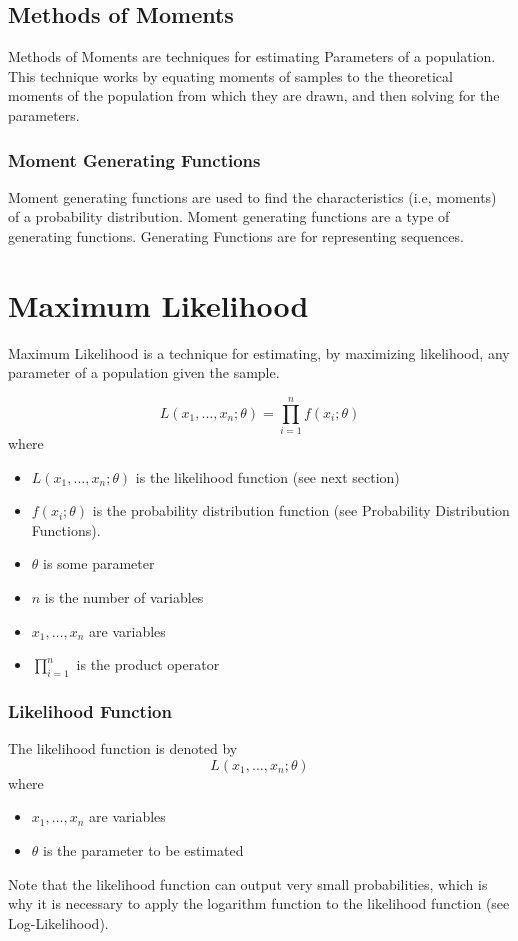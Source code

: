 \documentclass{article}
\begin{document}
\subsection{Methods of Moments}
Methods of Moments are techniques for estimating Parameters of a population. This technique works by equating moments of samples to the theoretical moments of the population from which they are drawn, and then solving for the parameters. 

\subsubsection{Moment Generating Functions}
Moment generating functions are used to find the characteristics (i.e, moments) of a probability distribution. Moment generating functions are a type of generating functions. Generating Functions are for representing sequences.

\newpage
\section{Maximum Likelihood}
Maximum Likelihood is a technique for estimating, by maximizing likelihood, any parameter of a population given the sample.

$$ L(x_1,\dots,x_n ;\theta)=\prod_{i=1}^{n} f(x_i; \theta) $$ \hfill \break
where \hfill \break
\begin{itemize}
    \item $L(x_1, \dots, x_n; \theta)$ is the likelihood function (see next section)
    \item $f(x_i; \theta)$ is the probability distribution function (see Probability Distribution Functions).
    \item $\theta$ is some parameter
    \item $n$ is the number of variables
    \item $ x_1, \dots, x_n $ are variables
    \item $ \prod_{i=1}^{n} $ is the product operator
\end{itemize}

\subsubsection{Likelihood Function}
The likelihood function is denoted by
$$ L(x_1, \dots, x_n; \theta) $$
where \hfill \break
\begin{itemize}
    \item $ x_1, \dots, x_n $ are variables
    \item $\theta$ is the parameter to be estimated
\end{itemize}
\hfill \break
Note that the likelihood function can output very small probabilities, which is why it is necessary to apply the logarithm function to the likelihood function (see Log-Likelihood).
\end{document}
